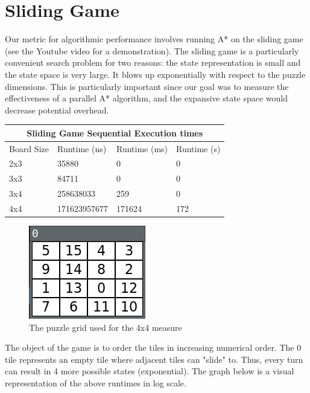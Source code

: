 \section{Sliding Game}
Our metric for algorithmic performance involves running A* on the sliding game (see the Youtube video for a demonstration). The sliding game is a particularly convenient search problem for two reasons: the state representation is small and the state space is very large. It blows up exponentially with respect to the puzzle dimensions. This is particularly important since our goal was to measure the effectiveness of a parallel A* algorithm, and the expansive state space would decrease potential overhead.
\newline\newline
\begin{tabular}{ |p{3cm}||p{3cm}|p{3cm}|p{3cm}|  }
\hline
\multicolumn{4}{|c|}{Sliding Game Sequential Execution times} \\
\hline
Board Size& Runtime (ns)&Runtime (ms)& Runtime (s)\\
\hline
2x3 & 35880 & 0 & 0\\
3x3 & 84711 & 0 & 0\\
3x4 & 258638033 & 259 & 0\\
4x4 & 171623957677 & 171624 & 172\\
\hline
\end{tabular}
\newline
\begin{figure}[h]
    \includegraphics[scale=0.5]{figures/4x4.png}
    \caption{The puzzle grid used for the 4x4 measure}
    \label{fig:gastar_ds}
\end{figure}
\newline
The object of the game is to order the tiles in increasing numerical order. The 0 tile represents an empty tile where adjacent tiles can "slide" to. Thus, every turn can result in 4 more possible states (exponential). The graph below is a visual representation of the above runtimes in log scale.


